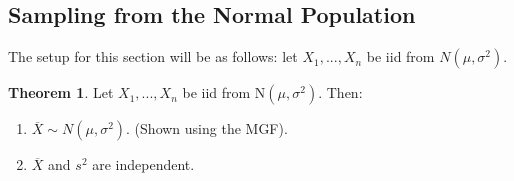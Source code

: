 \documentclass[11pt]{scrartcl}
\theoremstyle{definition}
\newtheorem{theorem}{Theorem}
\theoremstyle{remark}
\begin{document}
\subsection{Sampling from the Normal Population}

The setup for this section will be as follows: let $X_1, ..., X_n$ be iid from $N( \mu, \sigma^2)$. 

\begin{theorem}
	Let $X_1, ..., X_n$ be iid from N$(\mu, \sigma^2)$. Then: 
	\begin{enumerate}[noitemsep]
		\item $\overline{X} \sim N(\mu, \sigma^2)$. (Shown using the MGF). 
		\item $\overline{X}$ and $s^2$ are independent. 
	\end{enumerate}
\end{theorem}
\end{document}

